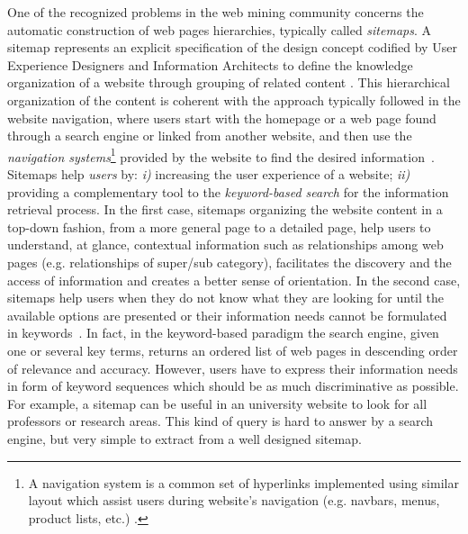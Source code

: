 

One of the recognized problems in the web mining community  concerns the automatic construction of web pages hierarchies, typically called \emph{sitemaps}.
A sitemap represents an explicit specification of the design concept codified by User Experience Designers and Information Architects to define the knowledge organization of a website through grouping of related content \cite{Nielsen:2006}. This hierarchical organization of the content is coherent with the approach typically followed in the website navigation, where users start with the homepage or a web page found through a search engine or linked from another website, and then use the \emph{navigation systems}\footnote{A navigation system is a common set of hyperlinks implemented using similar layout which assist users during website's navigation (e.g. navbars, menus, product lists, etc.) \cite{Crescenzi:2005}.} provided by the website to find the desired information~\cite{Fang:2007}. %
Sitemaps help \emph{users} by: \emph{i)} increasing the user experience of a website; \emph{ii)} providing a complementary tool to the \emph{keyword-based search} for the information retrieval process.
In the first case, sitemaps organizing the website content in a top-down fashion, from a more general page to a detailed page, help users to understand, at glance, contextual information such as relationships among web pages (e.g. relationships of super/sub category), facilitates the discovery and the access of information and creates a better sense of orientation. %
In the second case, sitemaps help users when they do not know what they are looking for until the available options are presented or their information needs cannot be formulated in keywords~\cite{Lee:2005, Olston:2003}. In fact, in the keyword-based paradigm the search engine, given one or several key terms, returns an ordered list of web pages in descending order of relevance and accuracy. However, users have to express their information needs in form of keyword sequences which  should be as much discriminative as possible. For example, a sitemap can be useful in an university website to look for all professors or research areas. This kind of query is hard to answer by a search engine, but very simple to extract from a well designed sitemap.

